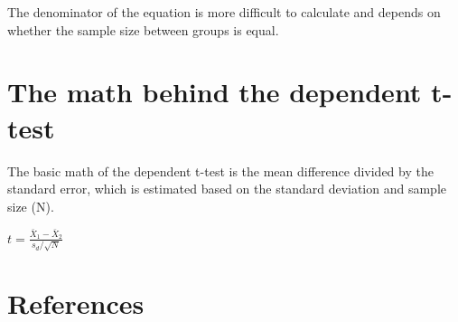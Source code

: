 \documentclass[
]{book}
\begin{document}
The denominator of the equation is more difficult to calculate and depends on whether the sample size between groups is equal.

\hypertarget{the-math-behind-the-dependent-t-test}{%
\chapter{The math behind the dependent t-test}\label{the-math-behind-the-dependent-t-test}}

The basic math of the dependent t-test is the mean difference divided by the standard error, which is estimated based on the standard deviation and sample size (N).

\(t = \frac{\bar{X}_1 - \bar{X}_2}{s_d/ \sqrt{N}}\)

\hypertarget{references}{%
\chapter{References}\label{references}}

  
\end{document}
